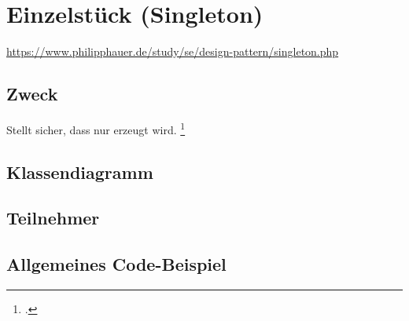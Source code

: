 \documentclass{lehramt-informatik-haupt}
\begin{document}

\chapter{Einzelstück (Singleton)}

\begin{liQuellen}
\item \cite{wiki:singleton}
\item \url{https://www.philipphauer.de/study/se/design-pattern/singleton.php}
\item \cite[Seite 109-115]{gof}
\item \cite[Kapitel 8.3.1, Seite 247-249]{schatten}
\item \cite[Kapitel 3.4 Seite 38-43]{eilebrecht}
\item \cite[Kapitel 1, Seite 1-17]{siebler}
\end{liQuellen}

\section{Zweck}

Stellt sicher, dass nur  erzeugt
wird.
\footcite[Seite 38]{eilebrecht}

%

\section{Klassendiagramm}

\liEntwurfsEinzelstueckUml

%

\section{Teilnehmer}

\liEntwurfsEinzelstueckAkteure

%

\section{Allgemeines Code-Beispiel}


\literatur
\end{document}
